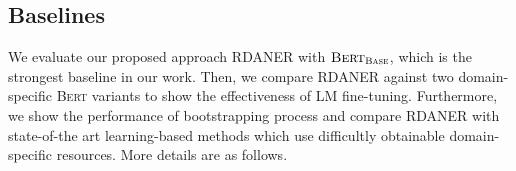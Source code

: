\documentclass[10pt, conference, compsocconf]{IEEEtran}
\newcommand{\bert}{\textsc{Bert}\xspace}
\newcommand{\rdaner}{\textsc{RDANER}\xspace}
\newcommand{\bertbase}{$\bert_{\textsc{Base}}$\xspace}
\begin{document}
\subsection{Baselines}
We evaluate our proposed approach \rdaner with \bertbase, which is the strongest baseline in our work.
Then, we compare \rdaner against two domain-specific \bert variants to show the 
effectiveness of LM fine-tuning.
Furthermore, we show the performance of bootstrapping process and
compare \rdaner with state-of-the art learning-based methods which use difficultly obtainable domain-specific resources.
More details are as follows.

\end{document}

